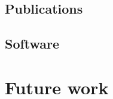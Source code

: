 \subsection{Publications}
\begin{refsection}
\nocite{Alvarez2019,Alvarez2021inference,AlvarezAyllonPresQ2022,Alvarez2022SOM}

\printbibliography[heading=none]
\end{refsection}

\subsection{Software}
\begin{refsection}
\nocite{PresQ,SOMA}

\printbibliography[heading=none]
\end{refsection}

\section{Future work}

